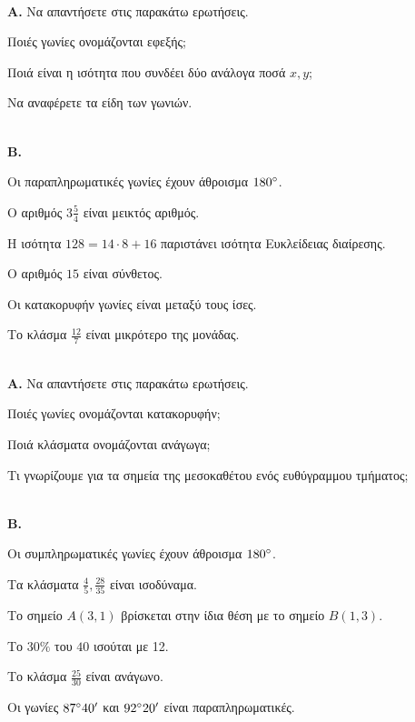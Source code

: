 \documentclass[ektypwsh]{diag-xelatex}
\begin{document}
\thewria
\begin{thema}
\item \mbox{}\\
\textbf{Α.} Να απαντήσετε στις παρακάτω ερωτήσεις.
\begin{rlist}
\item Ποιές γωνίες ονομάζονται εφεξής;
\item Ποιά είναι η ισότητα που συνδέει δύο ανάλογα ποσά $ x,y $;
\item Να αναφέρετε τα είδη των γωνιών.
\end{rlist}\mbox{}\\
\textbf{Β.} \swstolathos
\begin{rlist}
\item Οι παραπληρωματικές γωνίες έχουν άθροισμα $ 180\degree $.
\item Ο αριθμός $ 3\frac{5}{4} $ είναι μεικτός αριθμός.
\item Η ισότητα $ 128=14\cdot8+16 $ παριστάνει ισότητα Ευκλείδειας διαίρεσης.
\item Ο αριθμός $ 15 $ είναι σύνθετος.
\item Οι κατακορυφήν γωνίες είναι μεταξύ τους ίσες.
\item Το κλάσμα $ \frac{12}{7} $ είναι μικρότερο της μονάδας.
\end{rlist}
\item \mbox{}\\
\textbf{Α.} Να απαντήσετε στις παρακάτω ερωτήσεις.
\begin{rlist}
\item Ποιές γωνίες ονομάζονται κατακορυφήν;
\item Ποιά κλάσματα ονομάζονται ανάγωγα;
\item Τι γνωρίζουμε για τα σημεία της μεσοκαθέτου ενός ευθύγραμμου τμήματος;
\end{rlist}\mbox{}\\
\textbf{Β.} \swstolathos
\begin{rlist}
\item Οι συμπληρωματικές γωνίες έχουν άθροισμα $ 180\degree $.
\item Τα κλάσματα $ \frac{4}{5},\frac{28}{35} $ είναι ισοδύναμα.
\item Το σημείο $ A(3,1) $ βρίσκεται στην ίδια θέση με το σημείο $ B(1,3) $.
\item Το $ 30\% $ του $ 40 $ ισούται με 12.
\item Το κλάσμα $ \frac{25}{30} $ είναι ανάγωνο.
\item Οι γωνίες $ 87\degree 40' $ και $ 92\degree 20' $ είναι παραπληρωματικές.
\end{rlist}
\end{thema}
\end{document}
